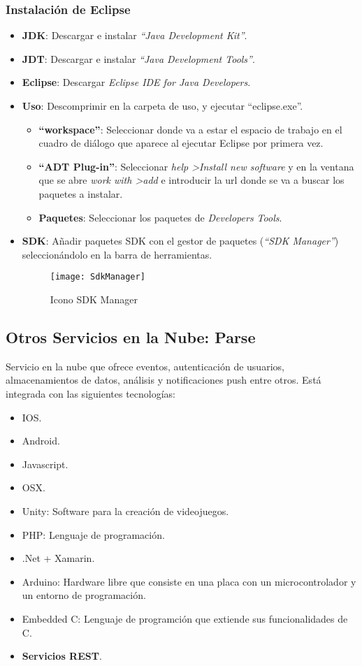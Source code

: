 	\subsubsection{Instalación de Eclipse}
		\begin{itemize}
			\item {\bf JDK}: Descargar e instalar {\it ``Java Development Kit''}\cite{17:jdk:online}.
			\item {\bf JDT}: Descargar e instalar {\it ``Java Development Tools''}\cite{21:jdt:online}.
			\item {\bf Eclipse}: Descargar {\it Eclipse IDE for Java Developers}\cite{15:eclipse:online}.
			\item {\bf Uso}: Descomprimir en la carpeta de uso, y ejecutar ``eclipse.exe''.
			\begin{itemize}
				\item {\bf ``workspace''}: Seleccionar donde va a estar el espacio de trabajo en el cuadro de diálogo que aparece al ejecutar Eclipse por primera vez.
				\item {\bf ``ADT Plug-in''}\cite{20:andoirdSDK:online}: Seleccionar {\it help \textgreater Install new software} y en la ventana que se abre {\it work with \textgreater add} e introducir la url donde se va a buscar los paquetes a instalar.
				\item {\bf Paquetes}: Seleccionar los paquetes de {\it Developers Tools}.
			\end{itemize}
			\item {\bf SDK}: Añadir paquetes SDK con el gestor de paquetes ({\em ``SDK Manager''}) seleccionándolo en la barra de herramientas.
			\begin{figure}[h]
				\centering
				\texttt{[image: SdkManager]}
				\caption{Icono SDK Manager}
				\label{fig:SdkManager}
			\end{figure}
		\end{itemize}
	
	\subsection{Otros Servicios en la Nube: Parse\cite{16:parse:online}}
	Servicio en la nube que ofrece eventos, autenticación de usuarios, almacenamientos de datos, análisis y notificaciones push entre otros.
	Está integrada con las siguientes tecnologías:
	\begin{itemize}
		\item IOS.
		\item Android\cite{2:android:online}.
		\item Javascript.
		\item OSX.
		\item Unity: Software para la creación de videojuegos.
		\item PHP: Lenguaje de programación.
		\item .Net + Xamarin.
		\item Arduino: Hardware libre que consiste en una placa con un microcontrolador y un entorno de programación.
		\item Embedded C: Lenguaje de programción que extiende sus funcionalidades de C.
		\item {\bf Servicios REST}.
	\end{itemize}
	
